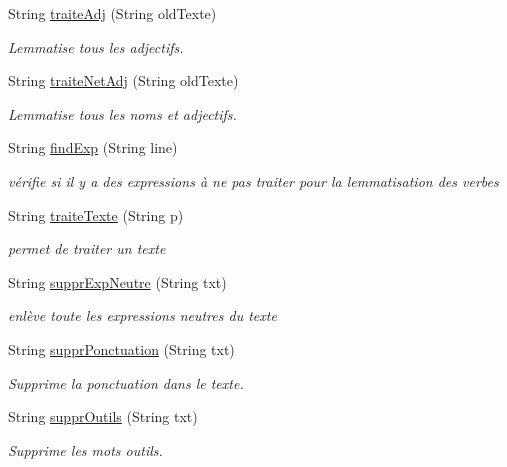 \begin{DoxyCompactItemize}
String \hyperlink{classlemmatiseur_1_1_lefff_a960e92d433f0ebf28b7d26fc35412547}{traite\+Adj} (String old\+Texte)
\begin{DoxyCompactList}\small\item\em Lemmatise tous les adjectifs. \end{DoxyCompactList}\item 
String \hyperlink{classlemmatiseur_1_1_lefff_a7772cc31ac1855fdf7080b886b23e393}{traite\+Net\+Adj} (String old\+Texte)
\begin{DoxyCompactList}\small\item\em Lemmatise tous les noms et adjectifs. \end{DoxyCompactList}\item 
String \hyperlink{classlemmatiseur_1_1_lefff_abf6050c2918c16ed1f6372bf53c635e6}{find\+Exp} (String line)
\begin{DoxyCompactList}\small\item\em vérifie si il y a des expressions à ne pas traiter pour la lemmatisation des verbes \end{DoxyCompactList}\item 
String \hyperlink{classlemmatiseur_1_1_lefff_a891e9578b68da3429b50ae8790b15ae5}{traite\+Texte} (String p)
\begin{DoxyCompactList}\small\item\em permet de traiter un texte \end{DoxyCompactList}\item 
String \hyperlink{classlemmatiseur_1_1_lefff_aefe143c79c4a9d5b47d7e0737a08b53b}{suppr\+Exp\+Neutre} (String txt)
\begin{DoxyCompactList}\small\item\em enlève toute les expressions neutres du texte \end{DoxyCompactList}\item 
String \hyperlink{classlemmatiseur_1_1_lefff_a74b4ed0aa991795fe7850cf1180205d6}{suppr\+Ponctuation} (String txt)
\begin{DoxyCompactList}\small\item\em Supprime la ponctuation dans le texte. \end{DoxyCompactList}\item 
String \hyperlink{classlemmatiseur_1_1_lefff_acb0f198179d03c9dfdf1fe42ed73d867}{suppr\+Outils} (String txt)
\begin{DoxyCompactList}\small\item\em Supprime les mots outils. \end{DoxyCompactList}\item 

\end{DoxyCompactItemize}
